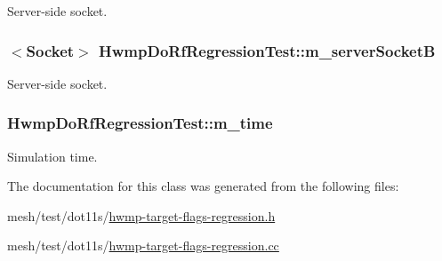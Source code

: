 Server-\/side socket. 

\subsubsection[{\texorpdfstring{m\+\_\+server\+SocketB}{m_serverSocketB}}]{$<${\bf Socket}$>$ Hwmp\+Do\+Rf\+Regression\+Test\+::m\+\_\+server\+SocketB\hspace{0.3cm}{\ttfamily [private]}}\hypertarget{classHwmpDoRfRegressionTest_a916daf5af41b03a35234ed314b0708b0}{}\label{classHwmpDoRfRegressionTest_a916daf5af41b03a35234ed314b0708b0}


Server-\/side socket. 

\subsubsection[{\texorpdfstring{m\+\_\+time}{m_time}}]{ Hwmp\+Do\+Rf\+Regression\+Test\+::m\+\_\+time\hspace{0.3cm}{\ttfamily [private]}}\hypertarget{classHwmpDoRfRegressionTest_a16ff8bb3b1ea62bfd36863be14d95c31}{}\label{classHwmpDoRfRegressionTest_a16ff8bb3b1ea62bfd36863be14d95c31}


Simulation time. 



The documentation for this class was generated from the following files\+:\begin{DoxyCompactItemize}
\item 
mesh/test/dot11s/\hyperlink{hwmp-target-flags-regression_8h}{hwmp-\/target-\/flags-\/regression.\+h}\item 
mesh/test/dot11s/\hyperlink{hwmp-target-flags-regression_8cc}{hwmp-\/target-\/flags-\/regression.\+cc}\end{DoxyCompactItemize}
